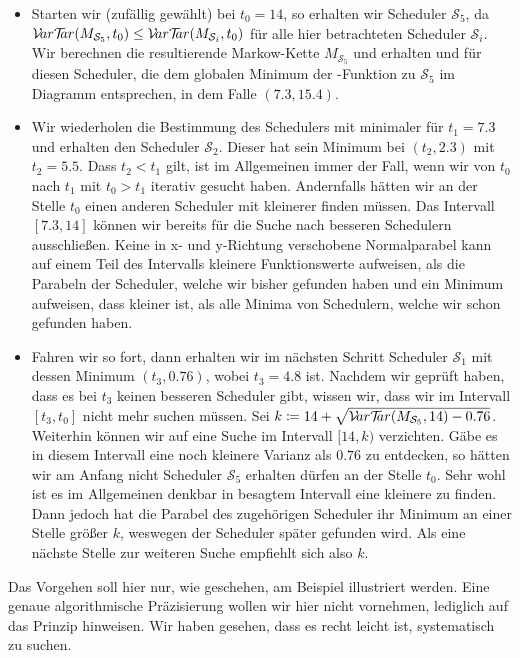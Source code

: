 \documentclass[a4paper]{article}
\newcommand{\mc}{Markow-Kette}
\theoremstyle{nonumberplain}
\begin{document}
	\begin{itemize}
		\item Starten wir (zufällig gewählt) bei $t_0=14$, so erhalten wir Scheduler $\mathcal{S}_5$, da $\mathcal{V}\!ar \mathcal{T}\!\!ar(M_{\mathcal{S}_5},t_0) \leq \mathcal{V}\!ar \mathcal{T}\!\!ar(M_{\mathcal{S}_i},t_0)$ für alle hier betrachteten Scheduler $\mathcal{S}_i$. Wir berechnen die resultierende \mc{} $M_{\mathcal{S}_5}$ und erhalten \var{} und \expect{} für diesen Scheduler, die dem globalen Minimum der \vt{}-Funktion zu $\mathcal{S}_5$ im Diagramm entsprechen, in dem Falle $(7.3,15.4)$.
		\item Wir wiederholen die Bestimmung des Schedulers mit minimaler \vt{} für $t_1=7.3$ und erhalten den Scheduler $\mathcal{S}_2$. Dieser hat sein Minimum bei $(t_2,2.3)$ mit $t_2 = 5.5$. Dass $t_2 < t_1$ gilt, ist im Allgemeinen immer der Fall, wenn wir von $t_0$ nach $t_1$ mit $t_0 > t_1$ iterativ gesucht haben. Andernfalls hätten wir an der Stelle $t_0$ einen anderen Scheduler mit kleinerer \vt{} finden müssen. Das Intervall $[7.3 , 14]$ können wir bereits für die Suche nach besseren Schedulern ausschließen. Keine in x- und y-Richtung verschobene Normalparabel kann auf einem Teil des Intervalls kleinere Funktionswerte aufweisen, als die Parabeln der Scheduler, welche wir bisher gefunden haben und ein Minimum aufweisen, dass kleiner ist, als alle Minima von Schedulern, welche wir schon gefunden haben. %
		\item Fahren wir so fort, dann erhalten wir im nächsten Schritt Scheduler $\mathcal{S}_1$ mit dessen Minimum $(t_3,0.76)$, wobei $t_3 = 4.8$ ist. Nachdem wir geprüft haben, dass es bei $t_3$ keinen besseren Scheduler gibt, wissen wir, dass wir im Intervall $[t_3,t_0]$ nicht mehr suchen müssen. Sei $k \coloneqq 14 + \sqrt{\mathcal{V}\!ar \mathcal{T}\!\!ar(M_{\mathcal{S}_5},14)-0.76}$. Weiterhin können wir auf eine Suche im Intervall $[14, k)$ verzichten. Gäbe es in diesem Intervall eine noch kleinere Varianz als $0.76$ zu entdecken, so hätten wir am Anfang nicht Scheduler $\mathcal{S}_5$ erhalten dürfen an der Stelle $t_0$. Sehr wohl ist es im Allgemeinen denkbar in besagtem Intervall eine kleinere \vt{} zu finden. Dann jedoch hat die Parabel des zugehörigen Scheduler ihr Minimum an einer Stelle größer $k$, weswegen der Scheduler später gefunden wird. Als eine nächste Stelle zur weiteren Suche empfiehlt sich also $k$.
	\end{itemize} 
	
	Das Vorgehen soll hier nur, wie geschehen, am Beispiel illustriert werden. Eine genaue algorithmische Präzisierung wollen wir hier nicht vornehmen, lediglich auf das Prinzip hinweisen. Wir haben gesehen, dass es recht leicht ist, systematisch zu suchen.
	
\end{document}
